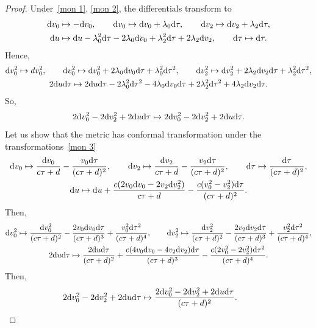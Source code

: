 \documentclass[pdftex]{sigma}%
\numberwithin{equation}{section}
\begin{document}
\begin{proof}Under~\eqref{mon 1}, \eqref{mon 2}, the differentials transform to
\begin{gather*}
{\rm d}v_0\mapsto-{\rm d}v_0,\qquad
{\rm d}v_0\mapsto {\rm d}v_0+\lambda_0{\rm d}\tau,\qquad
{\rm d}v_2\mapsto {\rm d}v_2+\lambda_2{\rm d}\tau,\\
{\rm d}u\mapsto {\rm d}u-\lambda_0^2{\rm d}\tau-2\lambda_0{\rm d}v_0+\lambda_2^2{\rm d}\tau+2\lambda_2{\rm d}v_2,\qquad
{\rm d}\tau\mapsto {\rm d}\tau.
\end{gather*}
Hence,
\begin{gather*}
{\rm d}v_0^2\mapsto dv^2_0,\qquad
{\rm d}v_0^2\mapsto {\rm d}v_0^2+2\lambda_0{\rm d}v_0{\rm d}\tau+\lambda_0^2{\rm d}\tau^2,\qquad
{\rm d}v_2^2\mapsto {\rm d}v_2^2+2\lambda_2{\rm d}v_2{\rm d}\tau+\lambda_2^2{\rm d}\tau^2,\\
2{\rm d}u {\rm d}\tau\mapsto 2{\rm d}u {\rm d}\tau-2\lambda_0^2{\rm d}\tau^2-4\lambda_0{\rm d}v_0{\rm d}\tau+2\lambda_2^2{\rm d}\tau^2+4\lambda_2{\rm d}v_2{\rm d}\tau.
\end{gather*}
So,
\begin{gather*}
2{\rm d}v_0^2-2{\rm d}v_2^2+2{\rm d}u {\rm d}\tau\mapsto 2{\rm d}v_0^2-2{\rm d}v_2^2+2{\rm d}u {\rm d}\tau.
\end{gather*}
Let us show that the metric has conformal transformation under the transformations~\eqref{mon 3}
\begin{gather*}
{\rm d}v_0\mapsto \frac{{\rm d}v_0}{c\tau+d}-\frac{v_0{\rm d}\tau}{(c\tau+d)^2},\qquad
{\rm d}v_2\mapsto \frac{{\rm d}v_2}{c\tau+d}-\frac{v_2{\rm d}\tau}{(c\tau+d)^2},\qquad
{\rm d}\tau\mapsto \frac{{\rm d}\tau}{(c\tau+d)^2},\\
{\rm d}u\mapsto {\rm d}u+\frac{c(2v_0{\rm d}v_0-2v_2{\rm d}v_2^2)}{c\tau+d}-\frac{c(v_0^2-v_2^2){\rm d}\tau}{(c\tau+d)^2}.
\end{gather*}
Then,
\begin{gather*}
{\rm d}v_0^2\mapsto \frac{{\rm d}v_0^2}{(c\tau+d)^2}-\frac{2v_0{\rm d}v_0{\rm d}\tau}{(c\tau+d)^3}+\frac{v_0^2{\rm d}\tau^2}{(c\tau+d)^4},\qquad
{\rm d}v_2^2\mapsto \frac{{\rm d}v_2^2}{(c\tau+d)^2}-\frac{2v_2{\rm d}v_2{\rm d}\tau}{(c\tau+d)^3}+\frac{v_2^2{\rm d}\tau^2}{(c\tau+d)^4},\\
2{\rm d}u {\rm d}\tau \mapsto \frac{2{\rm d}u {\rm d}\tau}{(c\tau+d)^2}+\frac{c(4v_0{\rm d}v_0-4v_2{\rm d}v_2){\rm d}\tau}{(c\tau+d)^3}-\frac{c(2v_0^2-2v_2^2){\rm d}\tau^2}{(c\tau+d)^4}.
\end{gather*}
Then,
\begin{gather*}
2{\rm d}v_0^2-2{\rm d}v_2^2+2{\rm d}u {\rm d}\tau\mapsto \frac{2{\rm d}v_0^2-2{\rm d}v_2^2+2{\rm d}u {\rm d}\tau}{(c\tau+d)^2}.
\tag*{\qed}
\end{gather*}
\renewcommand{\qed}{}
\end{proof}
\end{document}
